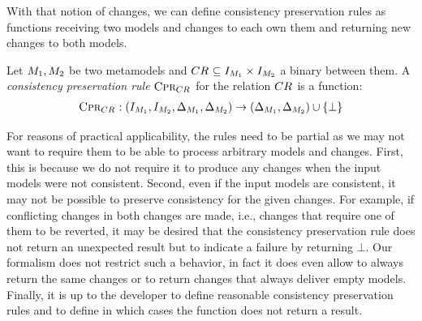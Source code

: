 With that notion of changes, we can define consistency preservation rules as functions receiving two models and changes to each own them and returning new changes to both models.

\begin{definition}
    \label{def:consistencypreservationrule}
    Let $M_{1}, M_{2}$ be two metamodels and $CR_{} \subseteq I_{M_{1}} \times I_{M_{2}}$ a binary \modellevelconsistencyrelation between them.
    A \emph{consistency preservation rule} $\textsc{Cpr}_{CR_{}}$ for the relation $CR_{}$ is a function:
    \begin{align*}
        \textsc{Cpr}_{CR_{}} : (I_{M_{1}}, I_{M_{2}}, \Delta_{M_{1}}, \Delta_{M_{2}}) \rightarrow (\Delta_{M_{1}}, \Delta_{M_{2}}) \cup \{ \bot \}
    \end{align*}
\end{definition}

For reasons of practical applicability, the rules need to be partial as we may not want to require them to be able to process arbitrary models and changes.
First, this is because we do not require it to produce any changes when the input models were not consistent.
Second, even if the input models are consistent, it may not be possible to preserve consistency for the given changes.
For example, if conflicting changes in both changes are made, i.e., changes that require one of them to be reverted, it may be desired that the consistency preservation rule does not return an unexpected result but to indicate a failure by returning $\bot$.
Our formalism does not restrict such a behavior, in fact it does even allow to always return the same changes or to return changes that always deliver empty models.
Finally, it is up to the developer to define reasonable consistency preservation rules and to define in which cases the function does not return a result.


